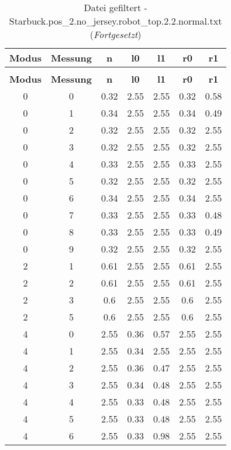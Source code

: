 \begin{longtable}{|c|c||c||c|c||c|c|}
	\caption{Datei gefiltert - Starbuck.pos\_2.no\_jersey.robot\_top.2.2.normal.txt} \label{tab:Starbuck.pos-2.no-jersey.robot-top.2.2.normal.txt} \\ \hline
	\textbf{Modus} & \textbf{Messung} & \textbf{n} & \textbf{l0} & \textbf{l1} & \textbf{r0} & \textbf{r1}\\ \hline
	\endfirsthead
	\caption[]{Datei gefiltert - Starbuck.pos\_2.no\_jersey.robot\_top.2.2.normal.txt (\emph{Fortgesetzt})} \\ \hline
	\textbf{Modus} & \textbf{Messung} & \textbf{n} & \textbf{l0} & \textbf{l1} & \textbf{r0} & \textbf{r1}\\ \hline
	\endhead
	0 & 0 & 0.32 & 2.55 & 2.55 & 0.32 & 0.58 \\ \hline
	0 & 1 & 0.34 & 2.55 & 2.55 & 0.34 & 0.49 \\ \hline
	0 & 2 & 0.32 & 2.55 & 2.55 & 0.32 & 2.55 \\ \hline
	0 & 3 & 0.32 & 2.55 & 2.55 & 0.32 & 2.55 \\ \hline
	0 & 4 & 0.33 & 2.55 & 2.55 & 0.33 & 2.55 \\ \hline
	0 & 5 & 0.32 & 2.55 & 2.55 & 0.32 & 2.55 \\ \hline
	0 & 6 & 0.34 & 2.55 & 2.55 & 0.34 & 2.55 \\ \hline
	0 & 7 & 0.33 & 2.55 & 2.55 & 0.33 & 0.48 \\ \hline
	0 & 8 & 0.33 & 2.55 & 2.55 & 0.33 & 0.49 \\ \hline
	0 & 9 & 0.32 & 2.55 & 2.55 & 0.32 & 2.55 \\ \hline
	2 & 1 & 0.61 & 2.55 & 2.55 & 0.61 & 2.55 \\ \hline
	2 & 2 & 0.61 & 2.55 & 2.55 & 0.61 & 2.55 \\ \hline
	2 & 3 & 0.6 & 2.55 & 2.55 & 0.6 & 2.55 \\ \hline
	2 & 5 & 0.6 & 2.55 & 2.55 & 0.6 & 2.55 \\ \hline
	4 & 0 & 2.55 & 0.36 & 0.57 & 2.55 & 2.55 \\ \hline
	4 & 1 & 2.55 & 0.34 & 2.55 & 2.55 & 2.55 \\ \hline
	4 & 2 & 2.55 & 0.36 & 0.47 & 2.55 & 2.55 \\ \hline
	4 & 3 & 2.55 & 0.34 & 0.48 & 2.55 & 2.55 \\ \hline
	4 & 4 & 2.55 & 0.33 & 0.48 & 2.55 & 2.55 \\ \hline
	4 & 5 & 2.55 & 0.33 & 0.48 & 2.55 & 2.55 \\ \hline
	4 & 6 & 2.55 & 0.33 & 0.98 & 2.55 & 2.55 \\ \hline

\end{longtable}
